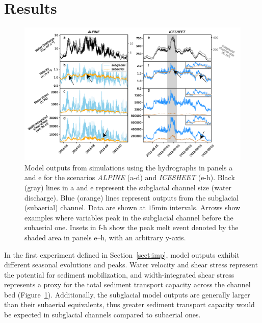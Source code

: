 \documentclass[draft]{agujournal2019}
\newcommand{\alpine}{\textit{ALPINE}}
\newcommand{\icesheet}{\textit{ICESHEET}}
\newcommand{\unit}[1]{$\mathrm{#1}$}
\begin{document}
\section{Results}
\begin{figure}[h]
  \centering
  \includegraphics[width=0.9\linewidth]{Fig2.png}
  \caption{Model outputs from simulations using the hydrographs in panels a and e for the scenarios \alpine{} (a-d) and \icesheet{} (e-h).
    Black (gray) lines in a and e represent the subglacial channel size (water discharge).
    Blue (orange) lines represent outputs from the subglacial (subaerial) channel.
    Data are shown at $15$\unit{min} intervals.
    Arrows show examples where variables peak in the subglacial channel before the subaerial one.
    Insets in f-h show the  peak melt event denoted by the shaded area in panels e--h, with an arbitrary y-axis.
  }
  \label{fig:model_outs}
\end{figure}

In the first experiment defined in Section~\ref{sect:imp}, model outputs exhibit different seasonal evolutions and peaks.
Water velocity and shear stress represent the potential for sediment mobilization, and width-integrated shear stress represents a proxy for the total sediment transport capacity across the channel bed (Figure~\ref{fig:model_outs}).
Additionally, the subglacial model outputs are generally larger than their subaerial equivalents, thus greater sediment transport capacity would be expected in subglacial channels compared to subaerial ones.
\end{document}
